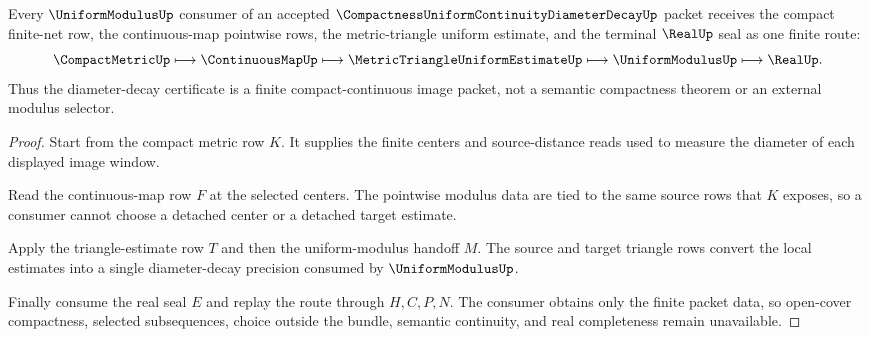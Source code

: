 \begin{theorem}
\label{thm:compactness-uniform-continuity-diameter-decay-route}
Every $\UniformModulusUp$ consumer of an accepted $\CompactnessUniformContinuityDiameterDecayUp$ packet receives the compact finite-net row, the continuous-map pointwise rows, the metric-triangle uniform estimate, and the terminal $\RealUp$ seal as one finite route:
$$
\CompactMetricUp \longmapsto \ContinuousMapUp \longmapsto \MetricTriangleUniformEstimateUp \longmapsto \UniformModulusUp \longmapsto \RealUp .
$$
Thus the diameter-decay certificate is a finite compact-continuous image packet, not a semantic compactness theorem or an external modulus selector.
\end{theorem}
\begin{proof}
Start from the compact metric row $K$. It supplies the finite centers and source-distance reads used to measure the diameter of each displayed image window.

Read the continuous-map row $F$ at the selected centers. The pointwise modulus data are tied to the same source rows that $K$ exposes, so a consumer cannot choose a detached center or a detached target estimate.

Apply the triangle-estimate row $T$ and then the uniform-modulus handoff $M$. The source and target triangle rows convert the local estimates into a single diameter-decay precision consumed by $\UniformModulusUp$.

Finally consume the real seal $E$ and replay the route through $H,C,P,N$. The consumer obtains only the finite packet data, so open-cover compactness, selected subsequences, choice outside the bundle, semantic continuity, and real completeness remain unavailable.
\end{proof}


